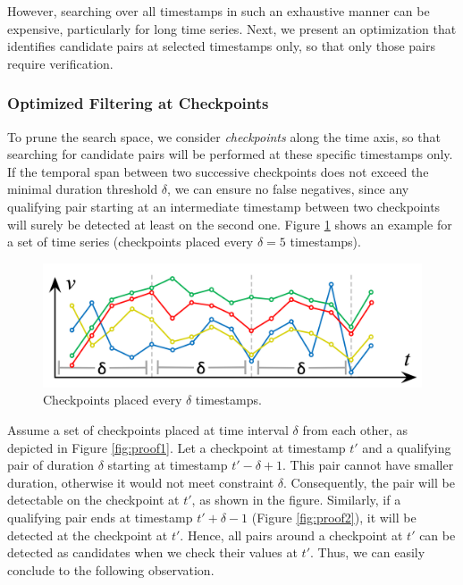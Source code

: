 However, searching over all timestamps in such an exhaustive manner can be expensive, particularly for long time series. Next, we present an optimization that identifies candidate pairs at selected timestamps only, so that only those pairs require verification.

\subsubsection{Optimized Filtering at Checkpoints}
\label{sec:checkpoint}

To prune the search space, we consider \textit{checkpoints} along the time axis, so that searching for candidate pairs will be performed at these specific timestamps only. If the temporal span between two successive checkpoints does not exceed the minimal duration threshold $\delta$, we can ensure no false negatives, since any qualifying pair starting at an intermediate timestamp between two checkpoints will surely be detected at least on the second one. Figure \ref{fig:checkpoints} shows an example for a set of time series (checkpoints placed every $\delta=5$ timestamps).

\begin{figure}[tb]
    \centering
    \includegraphics{figures/checkpoints.png}
    \caption{Checkpoints placed every $\delta$ timestamps.}
    \label{fig:checkpoints}
\end{figure}

Assume a set of checkpoints placed at time interval $\delta$ from each other, as depicted in Figure \ref{fig:proof1}. Let a checkpoint at timestamp $t'$ and a qualifying pair of duration $\delta$ starting at timestamp $t'-\delta+1$. This pair cannot have smaller duration, otherwise it would not meet constraint $\delta$. Consequently, the pair will be detectable on the checkpoint at $t'$, as shown in the figure. Similarly, if a qualifying pair ends at timestamp $t'+\delta-1$ (Figure \ref{fig:proof2}), it will be detected at the checkpoint at $t'$. Hence, all pairs around a checkpoint at $t'$ can be detected as candidates when we check their values at $t'$. Thus, we can easily conclude to the following observation.

